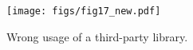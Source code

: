 \begin{figure}
    \centering
    \texttt{[image: figs/fig17\_new.pdf]}
    \caption{Wrong usage of a third-party library. 
    }
    
    
    \label{fig:discussion1}
    \vspace{-10pt}
\end{figure}